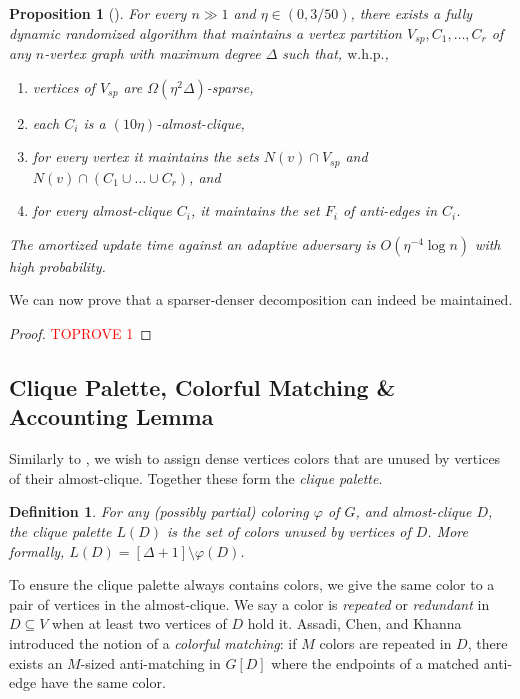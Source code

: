 \documentclass[a4paper,english,11pt]{amsart}
\newtheorem{proposition}[lemma]{Proposition}
\newtheorem{definition}[lemma]{Definition}
\theoremstyle{definition}
\newcommand{\whp}{$\text{w.h.p.}$\xspace}
\newcommand{\col}{\varphi}
\newcommand{\Vsparse}{V_{sp}}
\newcommand{\hateps}{\eta}
\begin{document}
\begin{proposition}[{\cite[Theorem 4.1]{BRW24}}]
    \label{prop:acd}
    For every $n \gg 1$ and $\hateps \in (0, 3/50)$, there exists a fully dynamic randomized algorithm that maintains a vertex partition $\Vsparse, C_1, \ldots, C_r$ of any $n$-vertex graph with maximum degree $\Delta$ such that, \whp,
    \begin{enumerate}
        \item vertices of $\Vsparse$ are $\Omega( \hateps^2\Delta )$-sparse,
        \item each $C_i$ is a $(10 \hateps)$-almost-clique,
        \item for every vertex it maintains the sets $N(v) \cap \Vsparse$ and $N(v) \cap (C_1 \cup \ldots \cup C_r)$, and
        \item for every almost-clique $C_i$, it maintains the set $F_i$ of anti-edges in $C_i$.
    \end{enumerate}
   The amortized update time against an adaptive adversary is $O(\hateps^{-4}\log n)$ with high probability.
\end{proposition}

We can now prove that a sparser-denser decomposition can indeed be maintained.

\begin{proof}\textcolor{red}{TOPROVE 1}\end{proof}




\subsection{Clique Palette, Colorful Matching \& Accounting Lemma}
\label{sec:colorful-matching}

Similarly to \cite{ACK19,FGHKN24}, we wish to assign dense vertices colors that are unused by vertices of their almost-clique. Together these form the \emph{clique palette}.
\begin{definition}
    \label{def:clique-palette}
    For any (possibly partial) coloring $\col$ of $G$, and almost-clique $D$, the \emph{clique palette} $L(D)$ is the set of colors unused by vertices of $D$. More formally, $L(D) = [\Delta + 1] \setminus \col(D)$.
\end{definition}

To ensure the clique palette always contains colors, we give the same color to a pair of vertices in the almost-clique.
We say a color is \emph{repeated} or \emph{redundant} in $D \subseteq V$ when at least two vertices of $D$ hold it. Assadi, Chen, and Khanna \cite{ACK19} introduced the notion of a \emph{colorful matching}: if $M$ colors are repeated in $D$, there exists an $M$-sized anti-matching in $G[D]$ where the endpoints of a matched anti-edge have the same color.
\end{document}
